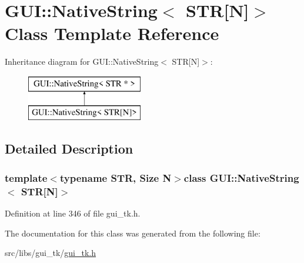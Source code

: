 \hypertarget{classGUI_1_1NativeString_3_01STR[N]_4}{\section{G\-U\-I\-:\-:Native\-String$<$ S\-T\-R\mbox{[}N\mbox{]}$>$ Class Template Reference}
\label{classGUI_1_1NativeString_3_01STR[N]_4}
}
Inheritance diagram for G\-U\-I\-:\-:Native\-String$<$ S\-T\-R\mbox{[}N\mbox{]}$>$\-:\begin{figure}[H]
\begin{center}
\leavevmode
\includegraphics[height=2.000000cm]{classGUI_1_1NativeString_3_01STR[N]_4}
\end{center}
\end{figure}


\subsection{Detailed Description}
\subsubsection*{template$<$typename S\-T\-R, Size N$>$class G\-U\-I\-::\-Native\-String$<$ S\-T\-R\mbox{[}\-N\mbox{]}$>$}



Definition at line 346 of file gui\-\_\-tk.\-h.



The documentation for this class was generated from the following file\-:\begin{DoxyCompactItemize}
\item 
src/libs/gui\-\_\-tk/\hyperlink{gui__tk_8h}{gui\-\_\-tk.\-h}\end{DoxyCompactItemize}
